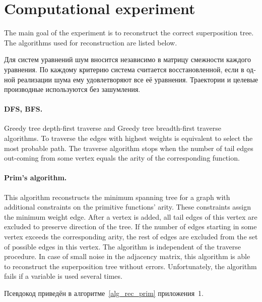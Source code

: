\documentclass[12pt]{article}
\newif\ifhighlight \highlighttrue
\newenvironment{ru}{\begin{otherlanguage}{russian}\ifhighlight\color{blue}\fi}{\end{otherlanguage}}
\begin{document}
\section{Computational experiment}
The main goal of the experiment is to reconstruct the correct superposition tree.  The algorithms used for reconstruction are listed below.

\begin{ru}
Для систем уравнений шум вносится независимо в матрицу смежности каждого уравнения. По каждому критерию система считается восстановленной, если в одной реализации шума ему удовлетворяют все её уравнения. Траектории и целевые производные используются без зашумления.
\end{ru}

\paragraph{DFS, BFS.}
Greedy tree depth-first traverse and Greedy tree breadth-first traverse algorithms. To traverse the edges with highest weights is equivalent to select the most probable path. The traverse algorithm stops when the number of tail edges out-coming from some vertex equals the arity of the corresponding function.

\paragraph{Prim's algorithm.}
This algorithm reconstructs the minimum spanning tree for a graph with additional constraints on the primitive functions' arity. These constraints assign the minimum weight edge. After a vertex is added, all tail edges of this vertex are excluded to preserve direction of the tree. If the number of edges starting in some vertex exceeds the corresponding arity, the rest of edges are excluded from the set of possible edges in this vertex. The algorithm is independent of the traverse procedure. In case of small noise in the adjacency matrix, this algorithm is able to reconstruct the superposition tree without errors. Unfortunately, the algorithm fails if a variable is used several times.

\begin{ru}
Псевдокод приведён в алгоритме~\ref{alg_rec_prim} приложения~1.
\end{ru}
\end{document}

